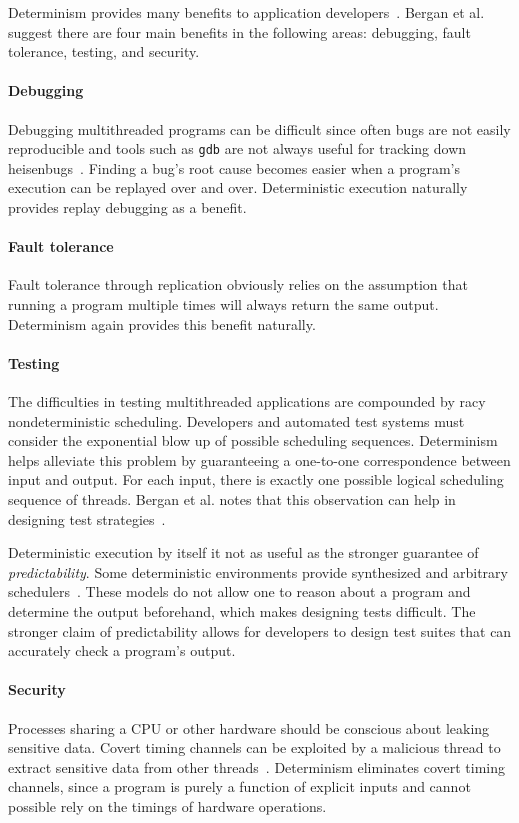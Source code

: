 Determinism provides many benefits to application
developers~\cite{Bergan11,olszewski2009kendo,bocchino2009parallel}. Bergan et
al. suggest there are four main benefits in
the following areas: debugging, fault tolerance, testing, and security.

\paragraph{Debugging} Debugging multithreaded programs can be difficult since
often bugs are not easily reproducible and tools such as {\tt gdb} are not
always useful for tracking down heisenbugs~\cite{Musuvathi08}. Finding a bug's
root cause becomes easier when a program's execution can be replayed over and
over. Deterministic execution naturally provides replay debugging as a benefit.

\paragraph{Fault tolerance} Fault tolerance through replication obviously relies
on the assumption that running a program multiple times will always return the
same output. Determinism again provides this benefit naturally.

\paragraph{Testing} The difficulties in testing multithreaded applications are
compounded by racy nondeterministic scheduling. Developers and automated test
systems must consider the exponential blow up of possible scheduling sequences.
Determinism helps alleviate this problem by guaranteeing a one-to-one
correspondence between input and output. For each input, there is exactly one
possible logical scheduling sequence of threads. Bergan et al. notes that this
observation can help in designing test strategies~\cite{Bergan11}.

Deterministic execution by itself it not as useful as the stronger guarantee of
\emph{predictability}. Some deterministic environments provide synthesized and
arbitrary schedulers~\cite{Aviram10,Devietti09}. These models do not allow one
to reason about a program and determine the output beforehand, which makes
designing tests difficult. The stronger claim of predictability allows for
developers to design test suites that can accurately check a program's output.
\iffalse
need I say more? tie into Determinator?
\fi

\paragraph{Security} Processes sharing a CPU or other hardware should be
conscious about leaking sensitive data. Covert timing channels can be exploited
by a malicious thread to extract sensitive data from other
threads~\cite{Aviram10cloud}. Determinism eliminates covert timing channels,
since a program is purely a function of explicit inputs and cannot possible rely
on the timings of hardware operations.
\\

